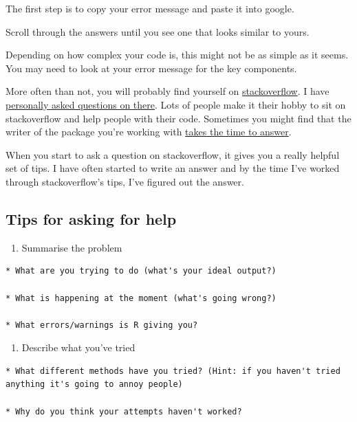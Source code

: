 \documentclass[
]{book}
\providecommand{\tightlist}{%
  \setlength{\itemsep}{0pt}\setlength{\parskip}{0pt}}
\begin{document}
The first step is to copy your error message and paste it into google.

Scroll through the answers until you see one that looks similar to yours.

Depending on how complex your code is, this might not be as simple as it seems. You may need to look at your error message for the key components.

More often than not, you will probably find yourself on \href{https://stackoverflow.com/}{stackoverflow}. I have \href{https://stackoverflow.com/questions/56036568/how-to-use-fct-relevel-with-mutate-at-syntax}{personally asked questions on there}. Lots of people make it their hobby to sit on stackoverflow and help people with their code. Sometimes you might find that the writer of the package you're working with \href{https://stackoverflow.com/questions/50375791/passing-top-n-and-arrange-to-ggplot-dplyr}{takes the time to answer}.

When you start to ask a question on stackoverflow, it gives you a really helpful set of tips. I have often started to write an answer and by the time I've worked through stackoverflow's tips, I've figured out the answer.

\hypertarget{trouble_help}{%
\subsection{Tips for asking for help}\label{trouble_help}}

\begin{enumerate}
\def\labelenumi{\arabic{enumi}.}
\tightlist
\item
  Summarise the problem
\end{enumerate}

\begin{verbatim}
* What are you trying to do (what's your ideal output?)

* What is happening at the moment (what's going wrong?)

* What errors/warnings is R giving you?
\end{verbatim}

\begin{enumerate}
\def\labelenumi{\arabic{enumi}.}
\setcounter{enumi}{1}
\tightlist
\item
  Describe what you've tried
\end{enumerate}

\begin{verbatim}
* What different methods have you tried? (Hint: if you haven't tried anything it's going to annoy people)

* Why do you think your attempts haven't worked?
\end{verbatim}
\end{document}
